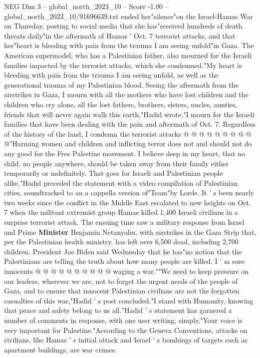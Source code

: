 \begin{textsample}{NEG Dim 3 – global\_north\_2023\_10 – Score -1.00 – global\_north\_2023\_10/91696639.txt}  \label{ex:f3_neg_260}
ended her"silence"on the Israel-Hamas War on Thursday, posting to social media that she has"received hundreds of death threats daily"in the aftermath of Hamas ' Oct. 7 terrorist attacks, and that her"heart is bleeding with pain from the trauma I am seeing unfold"in Gaza.
The American supermodel, who has a Palestinian father, also mourned for the Israeli families impacted by the terrorist attacks, which she condemned."My heart is bleeding with pain from the trauma I am seeing unfold, as well as the generational trauma of my Palestinian blood.
Seeing the aftermath from the airstrikes in Gaza, I mourn with all the mothers who have lost children and the children who cry alone, all the lost fathers, brothers, sisters, uncles, aunties, friends that will never again walk this earth,"Hadid wrote."I mourn for the Israeli families that have been dealing with the pain and aftermath of Oct. 7.
Regardless of the history of the land, I condemn the terrorist attacks @ @ @ @ @ @ @ @ @ @"Harming women and children and inflicting terror does not and should not do any good for the Free Palestine movement.
I believe deep in my heart, that no child, no people anywhere, should be taken away from their family either temporarily or indefinitely.
That goes for Israeli and Palestinian people alike."Hadid preceded the statement with a video compilation of Palestinian cities, soundtracked to an a cappella version of"Team"by Lorde.
It ' s been nearly two weeks since the conflict in the Middle East escalated to new heights on Oct. 7 when the militant extremist group Hamas killed 1,400 Israeli civilians in a surprise terrorist attack.
The ensuing time saw a military response from Israel and Prime \textbf{Minister} Benjamin Netanyahu, with airstrikes in the Gaza Strip that, per the Palestinian health ministry, has left over 6,500 dead, including 2,700 children.
President Joe Biden said Wednesday that he has"no notion that the Palestinians are telling the truth about how many people are killed.
I ' m sure innocents @ @ @ @ @ @ @ @ @ @ waging a war.""We need to keep pressure on our leaders, wherever we are, not to forget the urgent needs of the people of Gaza, and to ensure that innocent Palestinian civilians are not the forgotten casualties of this war,"Hadid ' s post concluded."I stand with Humanity, knowing that peace and safety belong to us all."Hadid ' s statement has garnered a number of comments in response, with one user writing, simply,"Your voice is very important for Palestine."According to the Geneva Conventions, attacks on civilians, like Hamas ' s initial attack and Israel ' s bombings of targets such as apartment buildings, are war crimes.

\end{textsample}

